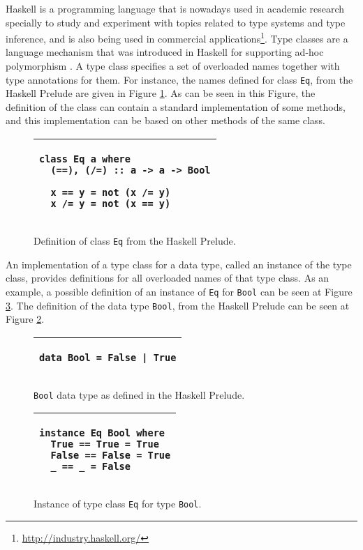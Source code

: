 \documentclass[msc]{ppgccufmg}
\begin{document}
Haskell is a programming language that is nowadays used in academic research specially to study and experiment with topics related to type systems and type inference, and is also being used in commercial applications\footnote{\url{http://industry.haskell.org/}}.
Type classes are a language mechanism that was introduced in Haskell for supporting ad-hoc polymorphism \citep{tch}.
A type class specifies a set of overloaded names together with type annotations for them.
For instance, the names defined for class \texttt{Eq}, from the Haskell Prelude \citep{report} are given in Figure \ref{Eq}.
As can be seen in this Figure, the definition of the class can contain a standard implementation of some methods, and this implementation can be based on other methods of the same class.

\begin{figure}
\caption{Definition of class \texttt{Eq} from the Haskell Prelude.\label{Eq}}
\begin{tabular}{|p{\textwidth}|}
\hline
\begin{verbatim}
class Eq a where
  (==), (/=) :: a -> a -> Bool

  x == y = not (x /= y)
  x /= y = not (x == y)
\end{verbatim}
\\
\hline
\end{tabular}
\end{figure}

An implementation of a type class for a data type, called an instance of the type class, provides definitions for all overloaded names of that type class.
As an example, a possible definition of an instance of \texttt{Eq} for \texttt{Bool} can be seen at Figure \ref{EqBool}.
The definition of the data type \texttt{Bool}, from the Haskell Prelude \citep{report} can be seen at Figure \ref{Bool}.

\begin{figure}
\caption{\texttt{Bool} data type as defined in the Haskell Prelude.\label{Bool}}
\begin{tabular}{|p{\textwidth}|}
\hline
\begin{verbatim}
data Bool = False | True
\end{verbatim}
\\
\hline
\end{tabular}
\end{figure}

\begin{figure}
\caption{Instance of type class \texttt{Eq} for type \texttt{Bool}.\label{EqBool}}
\begin{tabular}{|p{\textwidth}|}
\hline
\begin{verbatim}
instance Eq Bool where
  True == True = True
  False == False = True
  _ == _ = False
\end{verbatim}
\\
\hline
\end{tabular}
\end{figure}
\end{document}
